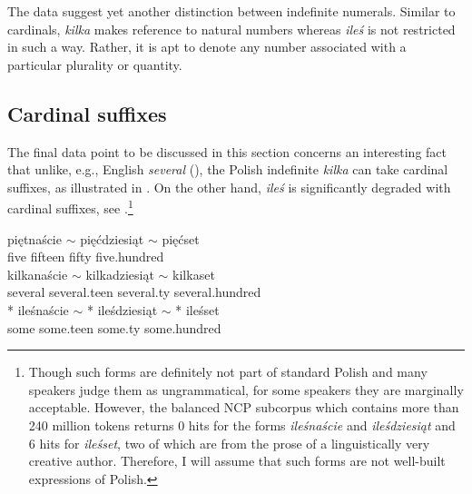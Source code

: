 \documentclass[output=paper,
]{langscibook}
\begin{document}
\noindent The data suggest yet another distinction between indefinite numerals. Similar to cardinals, \textit{kilka} makes reference to natural numbers whereas \textit{ileś} is not restricted in such a way. Rather, it is apt to denote any number associated with a particular plurality or quantity.
	
	\subsection{Cardinal suffixes}\label{sec:cardinal-suffixes}
	
	The final data point to be discussed in this section concerns an interesting fact that unlike, e.g., English \textit{several} (\citealt{kayne2007several}), the Polish indefinite \textit{kilka} can take cardinal suffixes, as illustrated in . On the other hand, \textit{ileś} is significantly degraded with cardinal suffixes, see .\footnote{Though such forms are definitely not part of standard Polish and many speakers judge them as ungrammatical, for some speakers they are marginally acceptable. However, the balanced NCP subcorpus which contains more than 240 million tokens returns 0 hits for the forms \textit{ileśnaście} and \textit{ileśdziesiąt} and 6 hits for \textit{ileśset}, two of which are from the prose of a linguistically very creative author. Therefore, I will assume that such forms are not well-built expressions of Polish.}
    
	
	\ea \label{ex:cardinal-suffixes} \ea {} {{pięt}naście $\sim$} {{pięć}dziesiąt $\sim$} {pięć}set\\
	five fifteen fifty five.hundred\\
	\ex {} {{kilka}naście $\sim$} {{kilka}dziesiąt $\sim$} {kilka}set\label{ex:cardinal-suffixes-kilka} \\
	several several.teen several.ty several.hundred\\
	\ex {} *\hspace{-2pt} {{ileś}naście $\sim$} *\hspace{-2pt} {{ileś}dziesiąt $\sim$} *\hspace{-2pt} {ileś}set\label{ex:cardinal-suffixes-iles} \\
	some {} some.teen {} some.ty {} some.hundred\\
	\z
    \z
\end{document}
